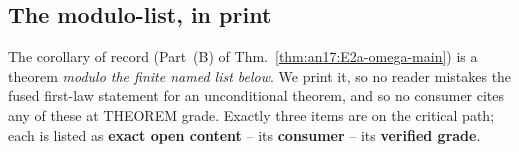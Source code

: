 \subsection{The modulo-list, in print}
\label{sec:an17-modulo}

The corollary of record (Part~(B) of
Thm.~\ref{thm:an17:E2a-omega-main}) is a theorem \emph{modulo the finite
named list below}.  We print it, so no reader mistakes the fused
first-law statement for an unconditional theorem, and so no consumer
cites any of these at THEOREM grade.  Exactly three items are on the
critical path; each is listed as \textbf{exact open content} -- its
\textbf{consumer} -- its \textbf{verified grade}.


